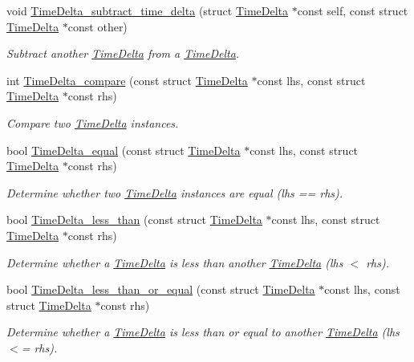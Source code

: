 \begin{DoxyCompactItemize}
void \hyperlink{time-delta_8h_a330935197046fb801abc7912aa909508}{\-Time\-Delta\-\_\-subtract\-\_\-time\-\_\-delta} (struct \hyperlink{structTimeDelta}{\-Time\-Delta} $\ast$const self, const struct \hyperlink{structTimeDelta}{\-Time\-Delta} $\ast$const other)
\begin{DoxyCompactList}\small\item\em \-Subtract another \hyperlink{structTimeDelta}{\-Time\-Delta} from a \hyperlink{structTimeDelta}{\-Time\-Delta}. \end{DoxyCompactList}\item 
int \hyperlink{time-delta_8h_a1864d69bcd1b4cf445555bc72c21a653}{\-Time\-Delta\-\_\-compare} (const struct \hyperlink{structTimeDelta}{\-Time\-Delta} $\ast$const lhs, const struct \hyperlink{structTimeDelta}{\-Time\-Delta} $\ast$const rhs)
\begin{DoxyCompactList}\small\item\em \-Compare two \hyperlink{structTimeDelta}{\-Time\-Delta} instances. \end{DoxyCompactList}\item 
bool \hyperlink{time-delta_8h_a7db38b37aac9487c278a42220c114e1f}{\-Time\-Delta\-\_\-equal} (const struct \hyperlink{structTimeDelta}{\-Time\-Delta} $\ast$const lhs, const struct \hyperlink{structTimeDelta}{\-Time\-Delta} $\ast$const rhs)
\begin{DoxyCompactList}\small\item\em \-Determine whether two \hyperlink{structTimeDelta}{\-Time\-Delta} instances are equal (lhs == rhs). \end{DoxyCompactList}\item 
bool \hyperlink{time-delta_8h_af24c777c13189265da630889ece952e6}{\-Time\-Delta\-\_\-less\-\_\-than} (const struct \hyperlink{structTimeDelta}{\-Time\-Delta} $\ast$const lhs, const struct \hyperlink{structTimeDelta}{\-Time\-Delta} $\ast$const rhs)
\begin{DoxyCompactList}\small\item\em \-Determine whether a \hyperlink{structTimeDelta}{\-Time\-Delta} is less than another \hyperlink{structTimeDelta}{\-Time\-Delta} (lhs $<$ rhs). \end{DoxyCompactList}\item 
bool \hyperlink{time-delta_8h_ad7360904634ace2d35968776c5222d7a}{\-Time\-Delta\-\_\-less\-\_\-than\-\_\-or\-\_\-equal} (const struct \hyperlink{structTimeDelta}{\-Time\-Delta} $\ast$const lhs, const struct \hyperlink{structTimeDelta}{\-Time\-Delta} $\ast$const rhs)
\begin{DoxyCompactList}\small\item\em \-Determine whether a \hyperlink{structTimeDelta}{\-Time\-Delta} is less than or equal to another \hyperlink{structTimeDelta}{\-Time\-Delta} (lhs $<$= rhs). \end{DoxyCompactList}\item 

\end{DoxyCompactItemize}
